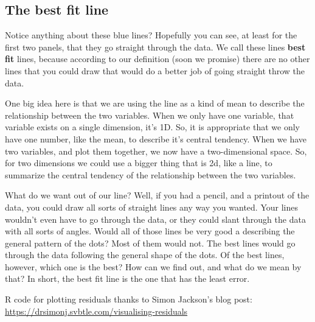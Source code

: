 \documentclass[
  letterpaper,
  DIV=11,
  numbers=noendperiod]{scrreprt}
\begin{document}
\subsection{The best fit line}\label{the-best-fit-line}

Notice anything about these blue lines? Hopefully you can see, at least
for the first two panels, that they go straight through the data. We
call these lines \textbf{best fit} lines, because according to our
definition (soon we promise) there are no other lines that you could
draw that would do a better job of going straight throw the data.

One big idea here is that we are using the line as a kind of mean to
describe the relationship between the two variables. When we only have
one variable, that variable exists on a single dimension, it's 1D. So,
it is appropriate that we only have one number, like the mean, to
describe it's central tendency. When we have two variables, and plot
them together, we now have a two-dimensional space. So, for two
dimensions we could use a bigger thing that is 2d, like a line, to
summarize the central tendency of the relationship between the two
variables.

What do we want out of our line? Well, if you had a pencil, and a
printout of the data, you could draw all sorts of straight lines any way
you wanted. Your lines wouldn't even have to go through the data, or
they could slant through the data with all sorts of angles. Would all of
those lines be very good a describing the general pattern of the dots?
Most of them would not. The best lines would go through the data
following the general shape of the dots. Of the best lines, however,
which one is the best? How can we find out, and what do we mean by that?
In short, the best fit line is the one that has the least error.

\begin{tcolorbox}[enhanced jigsaw, title=\textcolor{quarto-callout-note-color}{\faInfo}\hspace{0.5em}{Note}, colframe=quarto-callout-note-color-frame, colbacktitle=quarto-callout-note-color!10!white, bottomtitle=1mm, leftrule=.75mm, rightrule=.15mm, titlerule=0mm, arc=.35mm, colback=white, opacitybacktitle=0.6, toprule=.15mm, toptitle=1mm, bottomrule=.15mm, coltitle=black, breakable, left=2mm, opacityback=0]

R code for plotting residuals thanks to Simon Jackson's blog post:
\url{https://drsimonj.svbtle.com/visualising-residuals}

\end{tcolorbox}
\end{document}
